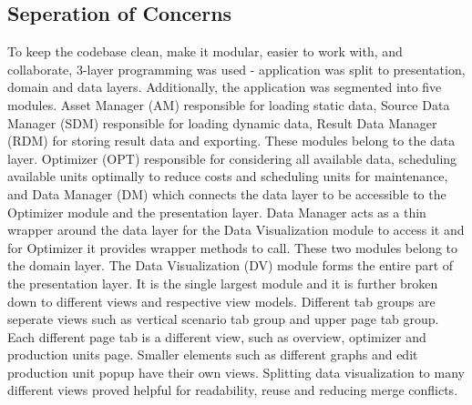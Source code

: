 \subsection*{Seperation of Concerns}
To keep the codebase clean, make it modular, easier to work with, and collaborate, 3-layer programming was used - application was split to presentation, domain and data layers. Additionally, the application was segmented into five modules. Asset Manager (AM) responsible for loading static data, Source Data Manager (SDM) responsible for loading dynamic data, Result Data Manager (RDM) for storing result data and exporting. These modules belong to the data layer. Optimizer (OPT) responsible for considering all available data, scheduling available units optimally to reduce costs and scheduling units for maintenance, and Data Manager (DM) which connects the data layer to be accessible to the Optimizer module and the presentation layer. Data Manager acts as a thin wrapper around the data layer for the Data Visualization module to access it and for Optimizer it provides wrapper methods to call. These two modules belong to the domain layer. The Data Visualization (DV) module forms the entire part of the presentation layer. It is the single largest module and it is further broken down to different views and respective view models. Different tab groups are seperate views such as vertical scenario tab group and upper page tab group. Each different page tab is a different view, such as overview, optimizer and production units page. Smaller elements such as different graphs and edit production unit popup have their own views. Splitting data visualization to many different views proved helpful for readability, reuse and reducing merge conflicts.

